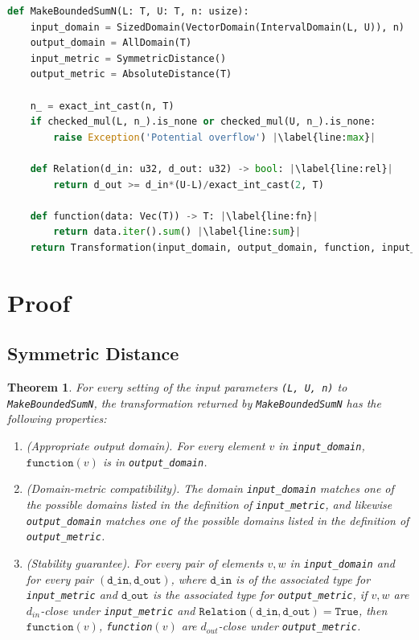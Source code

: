 \documentclass[11pt,a4paper]{article}
\newtheorem{theorem}{Theorem}
\theoremstyle{definition}
\newcommand{\din}{\texttt{d\_in}}
\newcommand{\dout}{\texttt{d\_out}}
\newcommand{\True}{\texttt{True}}
\newcommand{\function}{\texttt{function}}
\begin{document}
\begin{lstlisting}[language=Python, escapechar=|]
def MakeBoundedSumN(L: T, U: T, n: usize):
    input_domain = SizedDomain(VectorDomain(IntervalDomain(L, U)), n)
    output_domain = AllDomain(T)
    input_metric = SymmetricDistance()
    output_metric = AbsoluteDistance(T)
    
    n_ = exact_int_cast(n, T)
    if checked_mul(L, n_).is_none or checked_mul(U, n_).is_none: 
        raise Exception('Potential overflow') |\label{line:max}|
    
    def Relation(d_in: u32, d_out: u32) -> bool: |\label{line:rel}|
        return d_out >= d_in*(U-L)/exact_int_cast(2, T)
    
    def function(data: Vec(T)) -> T: |\label{line:fn}|
        return data.iter().sum() |\label{line:sum}|
    return Transformation(input_domain, output_domain, function, input_metric, output_metric, stability_relation = Relation)
\end{lstlisting}


\section{Proof}
\subsection{Symmetric Distance}
\begin{theorem}
    For every setting of the input parameters \texttt{(L, U, n)} to \texttt{MakeBoundedSumN}, the transformation returned by \texttt{MakeBoundedSumN} has the following properties:
    \begin{enumerate}
        \item \textup{(Appropriate output domain).} For every element $v$ in \texttt{input\_domain}, $\function(v)$ is in \texttt{output\_domain}.
        
        \item \textup{(Domain-metric compatibility).} The domain \texttt{input\_domain} matches one of the possible domains listed in the definition of \texttt{input\_metric}, and likewise \texttt{output\_domain} matches one of the possible domains listed in the definition of \texttt{output\_metric}.
        
        \item \textup{(Stability guarantee).} For every pair of elements $v, w$ in \texttt{input\_domain} and for every pair $(\din, \dout)$,  where $\din$ is of the associated type for \texttt{input\_metric} and $\dout$ is the associated type for \texttt{output\_metric}, if $v,w$ are $d_{in}$-close under \texttt{input\_metric} and $\texttt{Relation}(\din, \dout) = \True$, then $\function(v)$, \texttt{function}$(v)$ are $d_{out}$-close under \texttt{output\_metric}.
    \end{enumerate}
\end{theorem}
\end{document}

